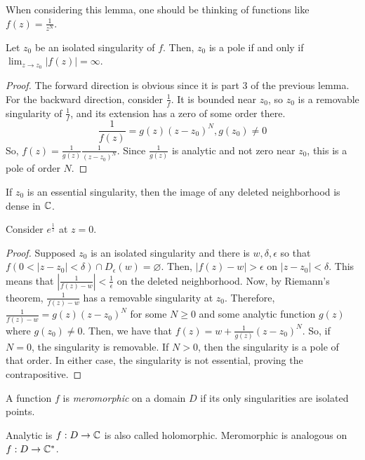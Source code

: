 \documentclass[11pt,leqno,oneside]{amsart}
\begin{document}
  When considering this lemma, one should be thinking of functions
  like $f(z) = \frac{1}{z^N}$.
  \begin{prop}
    Let $z_0$ be an isolated singularity of $f$. Then, $z_0$ is a pole
    if and only if $\lim_{z\to z_0} |f(z)| = \infty$.
  \end{prop}
  \begin{proof}
    The forward direction is obvious since it is part 3 of the
    previous lemma. For the backward direction, consider
    $\frac{1}{f}$. It is bounded near $z_0$, so $z_0$ is a removable
    singularity of $\frac{1}{f}$, and its extension has a zero of some
    order there. \[
      \frac{1}{f(z)} = g(z)(z-z_0)^N, g(z_0) \neq 0
    \]
    So, $f(z) = \frac{1}{g(z)}\frac{1}{(z-z_0)^N}$. Since
    $\frac{1}{g(z)}$ is analytic and not zero near $z_0$, this is a
    pole of order $N$.
  \end{proof}
  \begin{thm}
    If $z_0$ is an essential singularity, then the image of any
    deleted neighborhood is dense in ${\mathbb C}$.
  \end{thm}
  \begin{example}
    Consider $e^{\frac{1}{z}}$ at $z=0$. 
  \end{example}
  \begin{proof}
    Supposed $z_0$ is an isolated singularity and there is
    $w,\delta,\epsilon$ so that $f(0 < |z-z_0| < \delta) \cap
    D_\epsilon(w) = \varnothing$. Then, $|f(z)-w| > \epsilon$ on
    $|z-z_0| < \delta$. This means that $\left| \frac{1}{f(z)-w}
    \right| < \frac{1}{\epsilon}$ on the deleted neighborhood. Now, by
    Riemann's theorem, $\frac{1}{f(z)-w}$ has a removable singularity
    at $z_0$. Therefore, $\frac{1}{f(z)-w} = g(z)(z-z_0)^N$ for some
    $N \geq 0$ and some analytic function $g(z)$ where $g(z_0) \neq
    0$. Then, we have that $f(z) = w + \frac{1}{g(z)}(z-z_0)^N$. So,
    if $N=0$, the singularity is removable. If $N > 0$, then the
    singularity is a pole of that order. In either case, the
    singularity is not essential, proving the contrapositive.
  \end{proof}
  \begin{defn}
    A function $f$ is \emph{meromorphic} on a domain $D$ if its only
    singularities are isolated points.
  \end{defn}
  Analytic is $f: D \to {\mathbb C}$ is also called holomorphic. Meromorphic is
  analogous on $f: D \to {\mathbb C}^*$.
\end{document}
